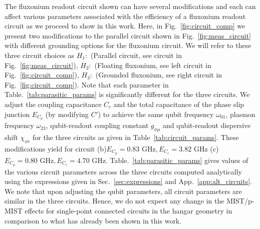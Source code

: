 \documentclass[%
reprint,
superscriptaddress,
 amsmath,amssymb,
 aps,
 prx,
longbibliography,
floatfix,
]{revtex4-2}
\begin{document}
The fluxonium readout circuit shown can have several modifications and each can affect various parameters associated with the efficiency of a fluxonium readout circuit as we proceed to show in this work. Here, in Fig.~\ref{fig:circuit_comp} we present two modifications to the parallel circuit shown in Fig.~\ref{fig:meas_circuit} with different grounding options for the fluxonium circuit. We will refer to these three circuit choices as $H_1:$ (Parallel circuit, see circuit in Fig.~\ref{fig:meas_circuit}), $H_2:$ (Floating fluxonium, see left circuit in Fig.~\ref{fig:circuit_comp}), $H_3:$ (Grounded fluxonium, see right circuit in Fig.~\ref{fig:circuit_comp}). Note that each parameter in Table.~\ref{tab:parasitic_params} is significantly different for the three circuits. We adjust the coupling capacitance $C_c$ and the total capacitance of the phase slip junction $E_{C_p}$ (by modifying $C'$) to achieve the same qubit frequency $\omega_{01}$, plasmon frequency $\omega_{23}$, qubit-readout coupling constant $g_{\phi \mu}$ and qubit-readout dispersive shift $\chi_{\phi r}$ for the three circuits as given in Table~\ref{tab:circuit_params}. These modifications yield for circuit (b)$E_{C_p}=0.83  \textrm{ GHz},E_{C_c}=3.82\textrm{ GHz}$ (c) $E_{C_p}=0.80\textrm{ GHz},E_{C_c}=4.70\textrm{ GHz}$. Table.~\ref{tab:parasitic_params} gives values of the various circuit parameters across the three circuits computed analytically using the expressions given in Sec.~\ref{sec:expressions} and App.~\ref{app:alt_circuits}. We note that upon adjusting the qubit parameters, all circuit parameters are similar in the three circuits. Hence, we do not expect any change in the MIST/p-MIST effects for single-point connected circuits in the hangar geometry in comparison to what has already been shown in this work.
\end{document}
